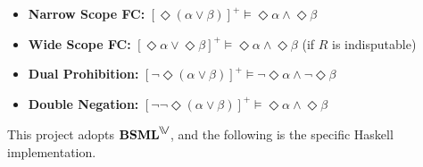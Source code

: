 \begin{itemize}
    \item \textbf{Narrow Scope FC:} \quad ${[ \Diamond (\alpha \lor \beta) ]}^+ \models \Diamond \alpha \land \Diamond \beta$
    \item \textbf{Wide Scope FC:} \quad ${[\Diamond \alpha \lor \Diamond \beta]}^+ \models \Diamond \alpha \land \Diamond \beta$ 
          \quad (if $R$ is indisputable)
    \item \textbf{Dual Prohibition:} \quad ${[\neg \Diamond (\alpha \lor \beta)]}^+ \models \neg \Diamond \alpha \land \neg \Diamond \beta$
    \item \textbf{Double Negation:} \quad ${[\neg \neg \Diamond (\alpha \lor \beta)]}^+ \models \Diamond \alpha \land \Diamond \beta$
 \end{itemize}
 
 This project adopts \(\textbf{BSML}^{\inqdisj}\), and the following is the specific Haskell implementation.
   